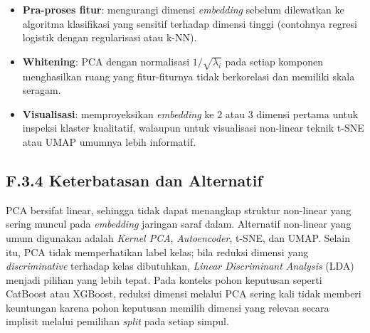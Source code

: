 \begin{itemize}
    \item \textbf{Pra-proses fitur}: mengurangi dimensi \textit{embedding} sebelum dilewatkan ke algoritma klasifikasi yang sensitif terhadap dimensi tinggi (contohnya regresi logistik dengan regularisasi atau k-NN).
    \item \textbf{Whitening}: PCA dengan normalisasi $1 / \sqrt{\lambda_i}$ pada setiap komponen menghasilkan ruang yang fitur-fiturnya tidak berkorelasi dan memiliki skala seragam.
    \item \textbf{Visualisasi}: memproyeksikan \textit{embedding} ke 2 atau 3 dimensi pertama untuk inspeksi klaster kualitatif, walaupun untuk visualisasi non-linear teknik t-SNE atau UMAP umumnya lebih informatif.
\end{itemize}

\subsection*{F.3.4 Keterbatasan dan Alternatif}

PCA bersifat linear, sehingga tidak dapat menangkap struktur non-linear yang sering muncul pada \textit{embedding} jaringan saraf dalam. Alternatif non-linear yang umum digunakan adalah \textit{Kernel PCA}, \textit{Autoencoder}, t-SNE, dan UMAP. Selain itu, PCA tidak memperhatikan label kelas; bila reduksi dimensi yang \textit{discriminative} terhadap kelas dibutuhkan, \textit{Linear Discriminant Analysis} (LDA) menjadi pilihan yang lebih tepat. Pada konteks pohon keputusan seperti CatBoost atau XGBoost, reduksi dimensi melalui PCA sering kali tidak memberi keuntungan karena pohon keputusan memilih dimensi yang relevan secara implisit melalui pemilihan \textit{split} pada setiap simpul.
